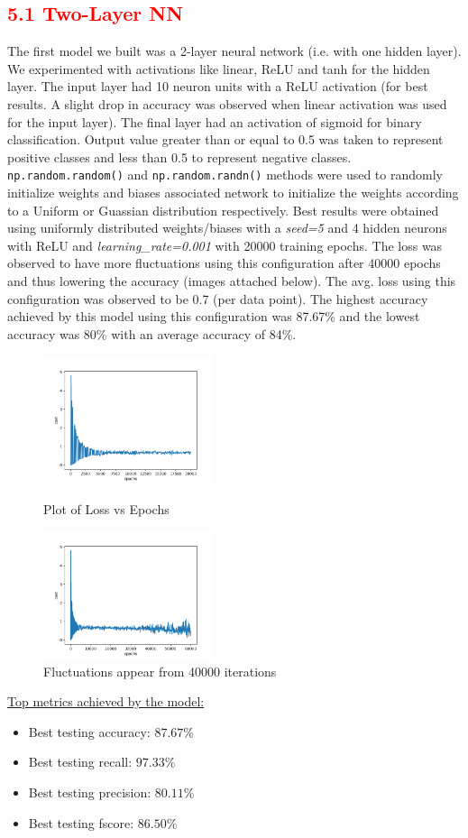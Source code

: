 \documentclass[a4paper,10pt,twocolumn]{article}
\begin{document}
\subsection*{\textcolor{red}{5.1 Two-Layer NN}}
The first model we built was a 2-layer neural network (i.e. with one hidden layer). We experimented with activations like linear, ReLU and tanh for the hidden layer. The input layer had 10 neuron units with a ReLU activation (for best results. A slight drop in accuracy was observed when linear activation was used for the input layer). The final layer had an activation of sigmoid for binary classification. Output value greater than or equal to 0.5 was taken to represent positive classes and less than 0.5 to represent negative classes.
\texttt{np.random.random()} and \texttt{np.random.randn()} methods were used to randomly initialize weights and biases associated network to initialize the weights according to a Uniform or Guassian distribution respectively. Best results were obtained using uniformly distributed weights/biases with a \emph{seed=5} and 4 hidden neurons with ReLU and \emph{learning\_rate=0.001} with 20000 training epochs. The loss was observed to have more fluctuations using this configuration after 40000 epochs and thus lowering the accuracy (images attached below). The avg. loss using this configuration was observed to be 0.7 (per data point). The highest accuracy achieved by this model using this configuration was 87.67\% and the lowest accuracy was 80\% with an average accuracy of 84\%.
\begin{figure}[h]
\centering
\includegraphics[scale=1.0, width=5cm]{Fig11.png}
\caption{Plot of Loss vs Epochs}
\includegraphics[scale=1.0, width=5cm]{Fig12.png}
\caption{Fluctuations appear from 40000 iterations}
\end{figure}
\newline
\underline{Top metrics achieved by the model:}
\begin{itemize}
\item{Best testing accuracy: $87.67\%$}
\item{Best testing recall: $97.33\%$}
\item{Best testing precision: $80.11\%$}
\item{Best testing fscore: $86.50\%$}
\end{itemize}
\end{document}
